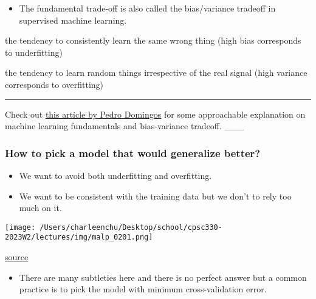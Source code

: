 \documentclass[11pt]{article}
\providecommand{\tightlist}{%
      \setlength{\itemsep}{0pt}\setlength{\parskip}{0pt}}
\begin{document}
\begin{itemize}
\tightlist
\item
  The fundamental trade-off is also called the bias/variance tradeoff in
  supervised machine learning.
\end{itemize}

\begin{description}
\tightlist
\item[\textbf{Bias}]
the tendency to consistently learn the same wrong thing (high bias
corresponds to underfitting)
\item[\textbf{Variance}]
the tendency to learn random things irrespective of the real signal
(high variance corresponds to overfitting)
\end{description}

    \begin{center}\rule{0.5\linewidth}{0.5pt}\end{center}

Check out
\href{https://homes.cs.washington.edu/~pedrod/papers/cacm12.pdf}{this
article by Pedro Domingos} for some approachable explanation on machine
learning fundamentals and bias-variance tradeoff. \_\_\_

    \subsubsection{How to pick a model that would generalize
better?}\label{how-to-pick-a-model-that-would-generalize-better}

\begin{itemize}
\tightlist
\item
  We want to avoid both underfitting and overfitting.
\item
  We want to be consistent with the training data but we don't to rely
  too much on it.
\end{itemize}

\texttt{[image: /Users/charleenchu/Desktop/school/cpsc330-2023W2/lectures/img/malp\_0201.png]}

\href{https://learning.oreilly.com/library/view/introduction-to-machine/9781449369880/ch02.html\#relation-of-model-complexity-to-dataset-size}{source}

    \begin{itemize}
\tightlist
\item
  There are many subtleties here and there is no perfect answer but a
  common practice is to pick the model with minimum cross-validation
  error.
\end{itemize}
\end{document}

